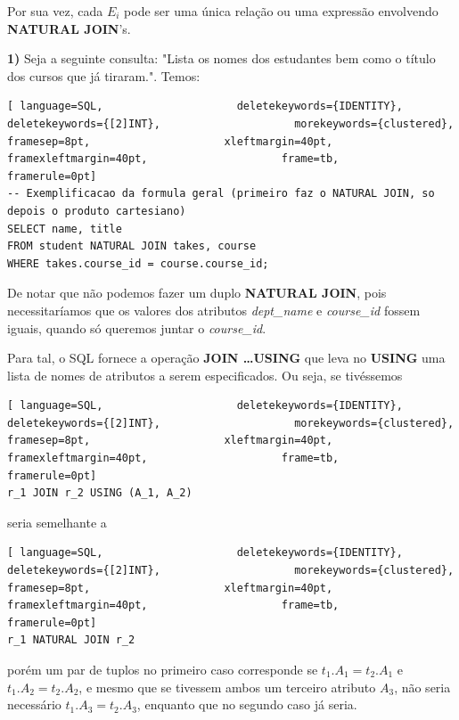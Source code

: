 \documentclass[oneside]{book}
\theoremstyle{definition}
\begin{document}
Por sua vez, cada $E_i$ pode ser uma única relação ou uma expressão envolvendo \textbf{NATURAL JOIN}'s.

\textbf{1)} Seja a seguinte consulta: "Lista os nomes dos estudantes bem como o título dos cursos que já tiraram.". Temos:
\begin{lstlisting}[ language=SQL,                     deletekeywords={IDENTITY},                     deletekeywords={[2]INT},                     morekeywords={clustered},                     framesep=8pt,                     xleftmargin=40pt,                     framexleftmargin=40pt,                     frame=tb,                     framerule=0pt]
-- Exemplificacao da formula geral (primeiro faz o NATURAL JOIN, so depois o produto cartesiano)
SELECT name, title
FROM student NATURAL JOIN takes, course
WHERE takes.course_id = course.course_id;
\end{lstlisting}

De notar que não podemos fazer um duplo \textbf{NATURAL JOIN}, pois necessitaríamos que os valores dos atributos \textit{dept\_name} e \textit{course\_id} fossem iguais, quando só queremos juntar o \textit{course\_id}. 

Para tal, o SQL fornece a operação \textbf{JOIN \dots USING} que leva no \textbf{USING} uma lista de nomes de atributos a serem especificados. Ou seja, se tivéssemos 
\begin{lstlisting}[ language=SQL,                     deletekeywords={IDENTITY},                     deletekeywords={[2]INT},                     morekeywords={clustered},                     framesep=8pt,                     xleftmargin=40pt,                     framexleftmargin=40pt,                     frame=tb,                     framerule=0pt]
r_1 JOIN r_2 USING (A_1, A_2)
\end{lstlisting}
seria semelhante a 
\begin{lstlisting}[ language=SQL,                     deletekeywords={IDENTITY},                     deletekeywords={[2]INT},                     morekeywords={clustered},                     framesep=8pt,                     xleftmargin=40pt,                     framexleftmargin=40pt,                     frame=tb,                     framerule=0pt]
r_1 NATURAL JOIN r_2
\end{lstlisting}
porém um par de tuplos no primeiro caso corresponde se $t_1.A_1 = t_2.A_1$ e $t_1.A_2 = t_2.A_2$, e mesmo que se tivessem ambos um terceiro atributo $A_3$, não seria necessário $t_1.A_3 = t_2.A_3$, enquanto que no segundo caso já seria.
\end{document}
